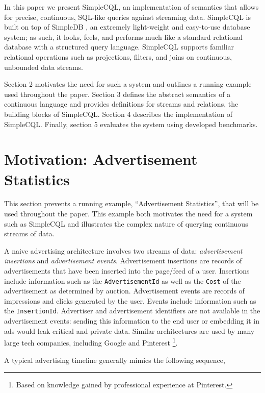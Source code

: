 \documentclass[a4paper, 10pt, conference]{IEEEconf}
\begin{document}
In this paper we present SimpleCQL, an implementation of semantics that allows for precise, continuous, SQL-like queries against streaming data.  SimpleCQL is built on top of SimpleDB \cite{simpledb}, an extremely light-weight and easy-to-use database system; as such, it looks, feels, and performs much like a standard relational database with a structured query language. SimpleCQL supports familiar relational operations such as projections, filters, and joins on continuous, unbounded data streams.

Section 2 motivates the need for such a system and outlines a running example used throughout the paper.  Section 3 defines the abstract semantics of a continuous language and provides definitions for streams and relations, the building blocks of SimpleCQL.  Section 4 describes the implementation of SimpleCQL.  Finally, section 5 evaluates the system using developed benchmarks.


\section{Motivation: Advertisement Statistics}
This section prevents a running example, ``Advertisement Statistics'', that will be used throughout the paper.  This example both motivates the need for a system such as SimpleCQL and illustrates the complex nature of querying continuous streams of data.

A naive advertising architecture involves two streams of data: \textit{advertisement insertions} and \textit{advertisement events}. Advertisement insertions are records of advertisements that have been inserted into the page/feed of a user.  Insertions include information such as the \texttt{AdvertisementId} as well as the \texttt{Cost} of the advertisement as determined by auction.  Advertisement events are records of impressions and clicks generated by the user.  Events include information such as the \texttt{InsertionId}.  Advertiser and advertisement identifiers are not available in the advertisement events: sending this information to the end user or embedding it in ads would leak critical and private data. Similar architectures are used by many large tech companies, including Google \cite{photon} and Pinterest \footnote{Based on knowledge gained by professional experience at Pinterest.}. 


A typical advertising timeline generally mimics the following sequence,
\end{document}
